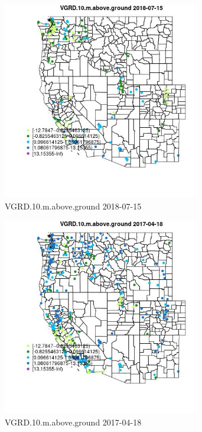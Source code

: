 \begin{figure} 
\centering  
\includegraphics[width=0.77\textwidth]{Code_Outputs/Report_ML_input_PM25_Step4_part_e_de_duplicated_aves_compiled_2019-05-21wNAs_MapObsVGRD10maboveground2018-07-15.jpg} 
\caption{\label{fig:Report_ML_input_PM25_Step4_part_e_de_duplicated_aves_compiled_2019-05-21wNAsMapObsVGRD10maboveground2018-07-15}VGRD.10.m.above.ground 2018-07-15} 
\end{figure} 
 

\begin{figure} 
\centering  
\includegraphics[width=0.77\textwidth]{Code_Outputs/Report_ML_input_PM25_Step4_part_e_de_duplicated_aves_compiled_2019-05-21wNAs_MapObsVGRD10maboveground2017-04-18.jpg} 
\caption{\label{fig:Report_ML_input_PM25_Step4_part_e_de_duplicated_aves_compiled_2019-05-21wNAsMapObsVGRD10maboveground2017-04-18}VGRD.10.m.above.ground 2017-04-18} 
\end{figure} 
 

